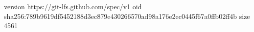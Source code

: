 version https://git-lfs.github.com/spec/v1
oid sha256:789b9619df5452188d3ec879e430266570ad98a176e2ec0445f67a0ffb02ff4b
size 4561
